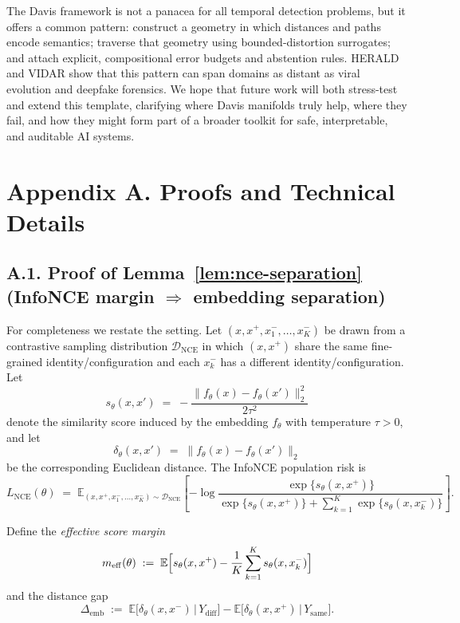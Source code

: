 \documentclass[11pt]{article}
\begin{document}
\medskip
The Davis framework is not a panacea for all temporal detection problems, but it offers a common
pattern: construct a geometry in which distances and paths encode semantics; traverse that geometry
using bounded-distortion surrogates; and attach explicit, compositional error budgets and abstention
rules. HERALD and VIDAR show that this pattern can span domains as distant as viral evolution and
deepfake forensics. We hope that future work will both stress-test and extend this template, clarifying
where Davis manifolds truly help, where they fail, and how they might form part of a broader toolkit
for safe, interpretable, and auditable AI systems.


\nocite{*}



\section*{Appendix A. Proofs and Technical Details}

\subsection*{A.1. Proof of Lemma~\ref{lem:nce-separation} (InfoNCE margin $\Rightarrow$ embedding separation)}

For completeness we restate the setting. Let $(x,x^{+},x_1^{-},\dots,x_K^{-})$ be drawn from a
contrastive sampling distribution $\mathcal{D}_{\mathrm{NCE}}$ in which $(x,x^{+})$ share the same
fine-grained identity/configuration and each $x_k^{-}$ has a different identity/configuration.  
Let
\[
s_\theta(x,x') \;=\; -\frac{\|f_\theta(x)-f_\theta(x')\|_2^2}{2\tau^2}
\]
denote the similarity score induced by the embedding $f_\theta$ with temperature $\tau>0$, and
let
\[
\delta_\theta(x,x') \;=\; \|f_\theta(x)-f_\theta(x')\|_2
\]
be the corresponding Euclidean distance. The InfoNCE population risk is
\[
L_{\mathrm{NCE}}(\theta)
\;=\;
\mathbb{E}_{(x,x^{+},x_1^{-},\dots,x_K^{-})\sim\mathcal{D}_{\mathrm{NCE}}}
\left[
-\log \frac{\exp\{s_\theta(x,x^{+})\}}
        {\exp\{s_\theta(x,x^{+})\} + \sum_{k=1}^K \exp\{s_\theta(x,x_k^{-})\}}
\right].
\]

Define the \emph{effective score margin}
\[
m_{\mathrm{eff}}(\theta)
\;:=\;
\mathbb{E}\Bigl[
s_\theta(x,x^{+}) - \frac{1}{K}\sum_{k=1}^K s_\theta(x,x_k^{-})
\Bigr]
\]
and the distance gap
\[
\Delta_{\mathrm{emb}}
\;:=\;
\mathbb{E}\bigl[\delta_\theta(x,x^{-}) \,\big|\, Y_{\mathrm{diff}}\bigr]
-
\mathbb{E}\bigl[\delta_\theta(x,x^{+}) \,\big|\, Y_{\mathrm{same}}\bigr].
\]
\end{document}
